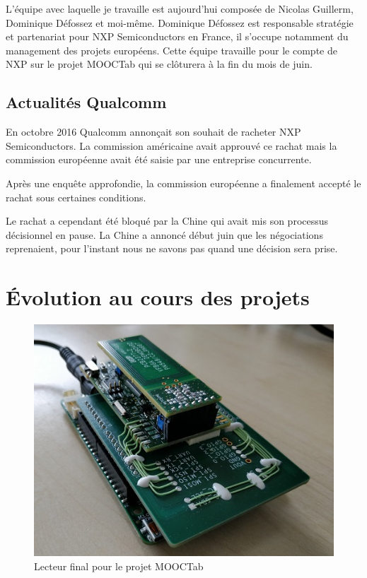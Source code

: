 \documentclass[french,12pt,a4paper,titlepage,openright,openbib]{report}
\begin{document}
L'équipe avec laquelle je travaille est aujourd'hui composée de Nicolas Guillerm, Dominique Défossez et moi-même. Dominique Défossez est responsable stratégie et partenariat pour NXP Semiconductors en France, il s'occupe notamment du management des projets européens.
Cette équipe travaille pour le compte de NXP sur le projet MOOCTab qui se clôturera à la fin du mois de juin.

\section{Actualités Qualcomm}
En octobre 2016 Qualcomm annonçait son souhait de racheter NXP Semiconductors. La commission américaine avait approuvé ce rachat mais la commission européenne avait été saisie par une entreprise concurrente.

Après une enquête approfondie, la commission européenne a finalement accepté le rachat sous certaines conditions.

Le rachat a cependant été bloqué par la Chine qui avait mis son processus décisionnel en pause. La Chine a annoncé début juin que les négociations reprenaient, pour l'instant nous ne savons pas quand une décision sera prise.



\chapter{Évolution au cours des projets}

\begin{figure}[!htb]
	\centering
	\includegraphics[width=0.8 \textwidth]{demoboard}
	\caption*{Lecteur final pour le projet MOOCTab}
\end{figure}
\end{document}

